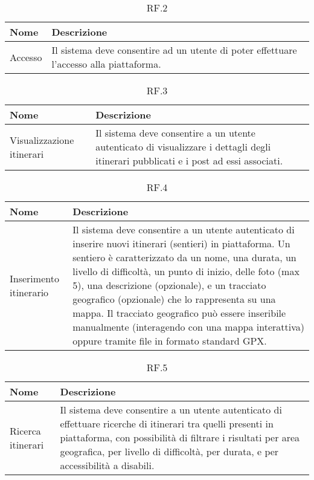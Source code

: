 \documentclass{natourDoc}
\begin{document}
	\begin{table}[H]
		\centering
		\begin{tabular}{ |p{5cm}|p{10.3cm}| } 
			\hline
			\rowcolor{PineGreen!70}
			\textbf{Nome} & \textbf{Descrizione} \\
			\hline
			Accesso & Il sistema deve consentire ad un utente di poter effettuare l'accesso alla piattaforma.\\ 
			\hline
		\end{tabular}
		\caption{RF.2}
		\label{table:2}
	\end{table}
	
	\begin{table}[H]
		\centering
		\begin{tabular}{ |p{5cm}|p{10.3cm}| }
			\hline
			\rowcolor{PineGreen!70}
			\textbf{Nome} & \textbf{Descrizione} \\
			\hline
			Visualizzazione itinerari & Il sistema deve consentire a un utente autenticato di visualizzare i
			dettagli degli itinerari pubblicati e i post ad essi associati. \\
			\hline
		\end{tabular}
		\caption{RF.3}
		\label{table:3}
	\end{table}

	\begin{table}[H]
		\centering
		\begin{tabular}{ |p{5cm}|p{10.3cm}| } 
			\hline
			\rowcolor{PineGreen!70}
			\textbf{Nome} & \textbf{Descrizione} \\
			\hline
			Inserimento itinerario &  Il sistema deve consentire a un utente autenticato di inserire nuovi itinerari (sentieri) in piattaforma. Un sentiero è
			caratterizzato da un nome, una durata, un livello di difficoltà, un punto di inizio, delle foto (max 5), una descrizione
			(opzionale), e un tracciato geografico (opzionale) che lo rappresenta su una mappa. Il tracciato
			geografico può essere inseribile manualmente (interagendo con una mappa interattiva) oppure
			tramite file in formato standard GPX.\\ 
			\hline
		\end{tabular}
		\caption{RF.4}
		\label{table:4}
	\end{table}
	
	\begin{table}[H]
		\centering
		\begin{tabular}{ |p{5cm}|p{10.3cm}| } 
			\hline
			\rowcolor{PineGreen!70}
			\textbf{Nome} & \textbf{Descrizione} \\
			\hline
			Ricerca itinerari &  Il sistema deve consentire a un utente autenticato di effettuare ricerche di itinerari tra quelli presenti in piattaforma, con possibilità di filtrare i risultati
			per area geografica, per livello di difficoltà, per durata, e per accessibilità a disabili.\\ 
			\hline
		\end{tabular}
		\caption{RF.5}
		\label{table:5}
	\end{table}
	
\end{document}
